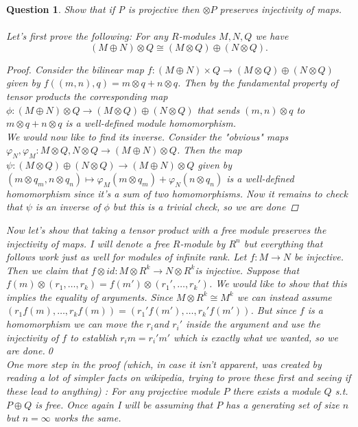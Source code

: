 \documentclass[a4paper]{article}
\newtheorem{que}[thm]{Question}
\begin{document}
\begin{que} Show that if P is projective then $\otimes P$ preserves injectivity of maps.\\ \\
    Let's first prove the following: For any $R$-modules $M,N,Q$ we have  \[
        \left( M \oplus N \right)\otimes Q \cong \left( M\otimes Q \right) \oplus \left( N\otimes Q \right) 
    .\] 
    \begin{proof}
        Consider the bilinear map $f:\left( M\oplus N \right) \times Q\to \left( M\otimes Q \right) \oplus \left( N\otimes Q\right) $ given by $f\left( \left( m,n \right), q \right)=m\otimes q+n\otimes q $. Then by the fundamental property of tensor products the corresponding map $\phi:\left( M\oplus N \right) \otimes Q\to \left( M\otimes Q \right) \oplus \left( N\otimes Q  \right) $ that sends $\left( m,n \right) \otimes q$ to $m\otimes q+n\otimes q$ is a well-defined module homomorphism.\\
        We would now like to find its inverse. Consider the "obvious" maps $\varphi_N,\varphi_M:M\otimes Q,N\otimes Q\to \left( M\oplus N \right) \otimes Q$. Then the map $\psi:\left( M\otimes Q \right) \oplus \left( N\otimes Q \right)\to \left( M\oplus N \right) \otimes Q $ given by $\left( m\otimes q_m,n\otimes q_n \right)\mapsto \varphi_M(m\otimes q_m)+\varphi_N\left( n\otimes q_n \right)$ is a well-defined homomorphism since it's a sum of two homomorphisms. Now it remains to check that $\psi$ is an inverse of $\phi$ but this is a trivial check, so we are done
    \end{proof}
    Now let's show that taking a tensor product with a free module preserves the injectivity of maps. I will denote a free $R$-module by $R^{n}$ but everything that follows work just as well for modules of infinite rank. Let $f:M\to N$ be injective. Then we claim that $f\otimes id:M\otimes R^{k}\to N\otimes R^{k}$is injective. Suppose that $f\left( m\right)\otimes \left( r_1, \ldots, r_k \right)=f\left( m'\right)\otimes \left( r_1', \ldots,r_k' \right) $. We would like to show that this implies the equality of arguments. Since $M\otimes R^{k}\cong M^{k}$ we can instead assume $\left( r_1f(m), \ldots, r_kf(m) \right) = \left( r_1'f(m'), \ldots ,r_k'f(m') \right) $. But since $f$ is a homomorphism we can move the $r_i$and  $r_i'$ inside the argument and use the injectivity of $f$ to establish $r_im=r_i'm'$ which is exactly what we wanted, so we are done.\qed\\
    One more step in the proof (which, in case it isn't apparent, was created by reading a lot of simpler facts on wikipedia, trying to prove these first and seeing if these lead to anything) : For any projective module $P$ there exists a module $Q$ s.t. $P\oplus Q$ is free. Once again I will be assuming that $P$ has a generating set of size $n$ but $n=\infty$ works the same.\\

\end{que}
\end{document}
